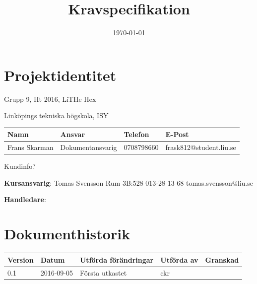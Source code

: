 \documentclass[a4paper,titlepage,12pt]{article}
\title{\textbf{Kravspecifikation}}
\date{\today}
\begin{document}
	\maketitle
	\newpage

	
	\begin{center}


		\section*{Projektidentitet}
		Grupp 9, Ht 2016, LiTHe Hex

		Linköpings tekniska högskola, ISY

		\begin{table}[h]
			\begin{tabular}[pos]{| l | l | l | l |}
				\hline
				\textbf{Namn} & \textbf{Ansvar} & \textbf{Telefon} & \textbf{E-Post} \\ \hline
				Frans Skarman & Dokumentansvarig & 0708798660 & frask812@student.liu.se \\ \hline
			\end{tabular}
		\end{table}


		Kundinfo?

		\textbf{Kursansvarig}: Tomas Svensson Rum 3B:528 013-28 13 68 tomas.svensson@liu.se

		\textbf{Handledare}:


		
		\newpage



		\section*{Dokumenthistorik}
		\begin{table}[h]
			\begin{tabular}[pos]{| l | l | l | l | l |}
				\hline
				\textbf{Version} & \textbf{Datum} & \textbf{Utförda förändringar} 
				& \textbf{Utförda av} & \textbf{Granskad} \\ \hline

				0.1 & 2016-09-05 & Första utkastet & ckr & \\ \hline

			\end{tabular}
		\end{table}

	\end{center}
\end{document}
